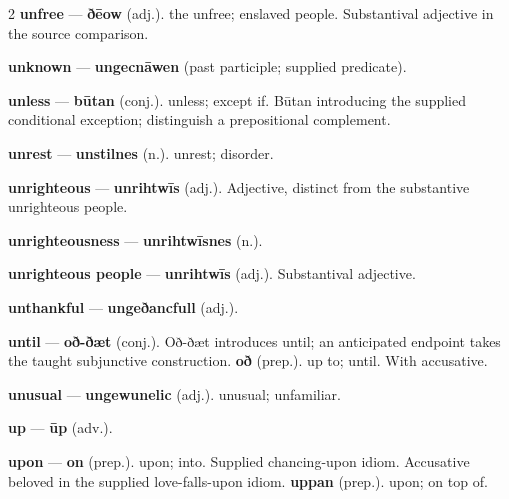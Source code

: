 \begin{multicols}{2}
\textbf{unfree} — \textbf{ðēow} (adj.). the unfree; enslaved people. Substantival adjective in the source comparison.\par
\textbf{unknown} — \textbf{ungecnāwen} (past participle; supplied predicate).\par
\textbf{unless} — \textbf{būtan} (conj.). unless; except if. Būtan introducing the supplied conditional exception; distinguish a prepositional complement.\par
\textbf{unrest} — \textbf{unstilnes} (n.). unrest; disorder.\par
\textbf{unrighteous} — \textbf{unrihtwīs} (adj.). Adjective, distinct from the substantive unrighteous people.\par
\textbf{unrighteousness} — \textbf{unrihtwīsnes} (n.).\par
\textbf{unrighteous people} — \textbf{unrihtwīs} (adj.). Substantival adjective.\par
\textbf{unthankful} — \textbf{ungeðancfull} (adj.).\par
\textbf{until} — \textbf{oð-ðæt} (conj.). Oð-ðæt introduces until; an anticipated endpoint takes the taught subjunctive construction. \textbf{oð} (prep.). up to; until. With accusative.\par
\textbf{unusual} — \textbf{ungewunelic} (adj.). unusual; unfamiliar.\par
\textbf{up} — \textbf{ūp} (adv.).\par
\textbf{upon} — \textbf{on} (prep.). upon; into. Supplied chancing-upon idiom. Accusative beloved in the supplied love-falls-upon idiom. \textbf{uppan} (prep.). upon; on top of.\par

\end{multicols}
